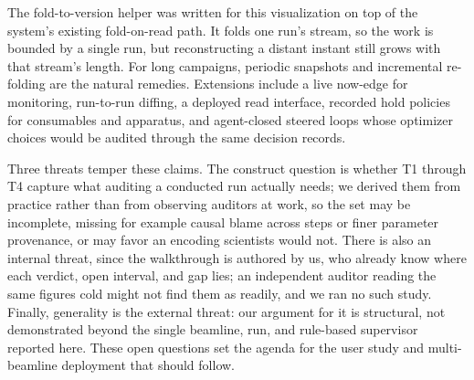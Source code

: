 The fold-to-version helper was written for this visualization on top of the
system's existing fold-on-read path. It folds one run's stream, so the work is
bounded by a single run, but reconstructing a distant instant still grows with
that stream's length. For long campaigns, periodic snapshots and incremental
re-folding are the natural remedies. Extensions include a live now-edge for
monitoring, run-to-run diffing, a deployed read interface, recorded hold policies
for consumables and apparatus, and agent-closed steered loops whose optimizer
choices would be audited through the same decision records.

Three threats temper these claims. The construct question is whether T1 through
T4 capture what auditing a conducted run actually needs; we derived them from
practice rather than from observing auditors at work, so the set may be
incomplete, missing for example causal blame across steps or finer parameter
provenance, or may favor an encoding scientists would not. There is also an
internal threat, since the walkthrough is authored by us, who already know where
each verdict, open interval, and gap lies; an independent auditor reading the
same figures cold might not find them as readily, and we ran no such study.
Finally, generality is the external threat: our argument for it is structural,
not demonstrated beyond the single beamline, run, and rule-based supervisor
reported here. These open questions set the agenda for the user study and
multi-beamline deployment that should follow.
